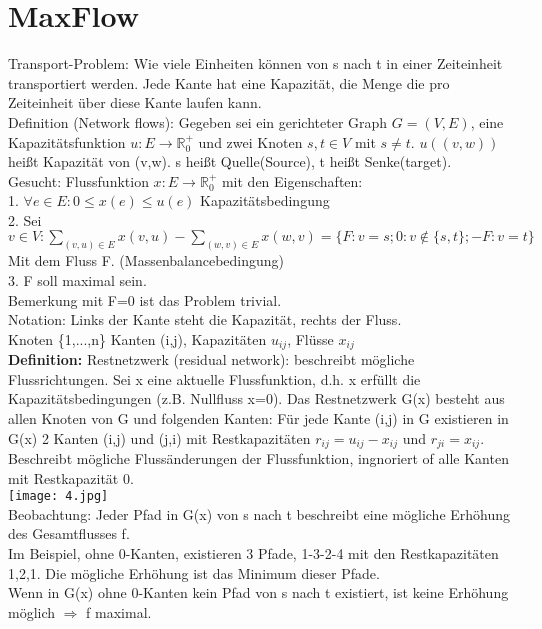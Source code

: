 \documentclass[a4paper]{article}
\newcommand{\pl}{\hspace*{1cm}}
\begin{document}
\section{MaxFlow}
Transport-Problem: Wie viele Einheiten können von s nach t in einer Zeiteinheit transportiert werden. Jede Kante hat eine Kapazität, die Menge die pro Zeiteinheit über diese Kante laufen kann.\\
Definition (Network flows): Gegeben sei ein gerichteter Graph $G=(V,E)$, eine Kapazitätsfunktion $u:E\rightarrow \mathbb{R}^+_0$ und zwei Knoten $s,t\in V$ mit $s\neq t$. $u((v,w))$ heißt Kapazität von (v,w). s heißt Quelle(Source), t heißt Senke(target).\\
Gesucht: Flussfunktion $x:E\rightarrow \mathbb{R}^+_0$ mit den Eigenschaften:\\
\pl 1. $\forall e\in E: 0\leq x(e)\leq u(e)$ Kapazitätsbedingung\\
\pl 2. Sei $v\in V: \sum_{(v,u)\in E} x(v,u) - \sum_{(w,v)\in E} x(w,v) = \{ F: v=s; 0: v\not\in \{s,t\};-F:v=t\}$ Mit dem Fluss F. (Massenbalancebedingung)\\
\pl 3. F soll maximal sein.\\
Bemerkung mit F=0 ist das Problem trivial.\\
Notation: Links der Kante steht die Kapazität, rechts der Fluss.\\
Knoten \{1,...,n\} Kanten (i,j), Kapazitäten $u_{ij}$, Flüsse $x_{ij}$\\
\textbf{Definition:} Restnetzwerk (residual network): beschreibt mögliche Flussrichtungen. Sei x eine aktuelle Flussfunktion, d.h. x erfüllt die Kapazitätsbedingungen (z.B. Nullfluss x=0). Das Restnetzwerk G(x) besteht aus allen Knoten von G und folgenden Kanten: Für jede Kante (i,j) in G existieren in G(x) 2 Kanten (i,j) und (j,i) mit Restkapazitäten $r_{ij} = u_{ij} - x_{ij}$ und  $r_{ji} = x_{ij}$. Beschreibt mögliche Flussänderungen der Flussfunktion, ingnoriert of alle Kanten mit Restkapazität 0.\\
\texttt{[image: 4.jpg]}\\
Beobachtung: Jeder Pfad in G(x) von s nach t beschreibt eine mögliche Erhöhung des Gesamtflusses f.\\
Im Beispiel, ohne 0-Kanten, existieren 3 Pfade, 1-3-2-4 mit den Restkapazitäten 1,2,1. Die mögliche Erhöhung ist das Minimum dieser Pfade.\\
Wenn in G(x) ohne 0-Kanten kein Pfad von s nach t existiert, ist keine Erhöhung möglich $\Rightarrow$ f maximal.\\
\end{document}
